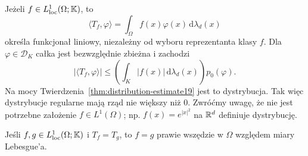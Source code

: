 \begin{przyklad}
\label{ex:regular19}
Jeżeli $f\in L^1_{\mathrm{loc}}(\Omega;\mathbb K)$, to
\[\langle T_f,\varphi\rangle=\int_\Omega
f(x)\varphi(x)\,\mathrm d\lambda_d(x)\]
określa funkcjonał liniowy, niezależny od wyboru reprezentanta
klasy $f$. Dla $\varphi\in\mathcal D_K$ całka jest bezwzględnie
zbieżna i zachodzi
\[|\langle T_f,\varphi\rangle|\le
\left(\int_K|f(x)|\,\mathrm d\lambda_d(x)\right)p_0(\varphi).\]
Na mocy Twierdzenia~\ref{thm:distribution-estimate19}
jest to dystrybucja. Tak więc dystrybucje regularne
mają rząd nie większy niż $0$.
Zwróćmy uwagę, że nie jest potrzebne założenie
$f\in L^1(\Omega)$; np. $f(x)=e^{|x|^2}$ na $\mathbb R^d$
definiuje dystrybucję.
\end{przyklad}

\begin{stwierdzenie}
\label{prop:regular-injective19}
Jeśli $f,g\in L^1_{\mathrm{loc}}(\Omega;\mathbb K)$ i $T_f=T_g$,
to $f=g$ prawie wszędzie w $\Omega$ względem miary Lebesgue'a.
\end{stwierdzenie}
